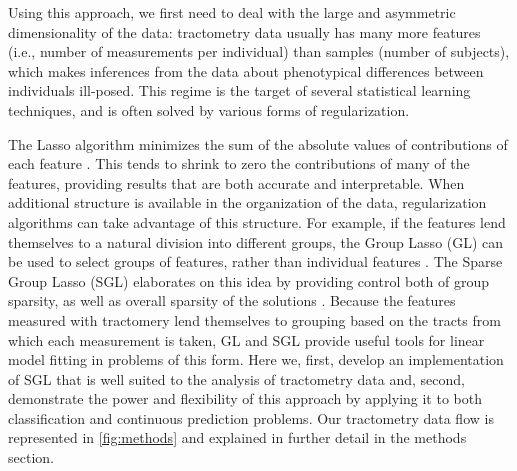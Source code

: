\documentclass[10pt,letterpaper]{article}
\begin{document}
Using this approach, we first need to deal with the large and
asymmetric dimensionality of the data: tractometry data usually has
many more features (i.e., number of measurements per individual) than
samples (number of subjects), which makes inferences from the data
about phenotypical differences between individuals ill-posed. This
regime is the target of several statistical learning techniques, and
is often solved by various forms of regularization.

The Lasso algorithm minimizes the sum of the absolute values of
contributions of each feature \cite{Tibshirani1996-qs}. This
tends to shrink to zero the contributions of many of the features,
providing results that are both accurate and interpretable. When
additional structure is available in the organization of the data,
regularization algorithms can take advantage of this structure. For
example, if the features lend themselves to a natural division into
different groups, the Group Lasso (GL) can be used to select groups
of features, rather than individual features \cite{Yuan2006-ky}.
The Sparse Group Lasso (SGL) elaborates on this idea by providing
control both of group sparsity, as well as overall sparsity of the
solutions \cite{simon2013sgl}. Because the features measured with
tractomery lend themselves to grouping based on the tracts from which
each measurement is taken, GL and SGL provide useful tools
for linear model fitting in problems of this form. Here we, first,
develop an implementation of SGL that is well suited to the analysis of
tractometry data and, second, demonstrate the power and flexibility of
this approach by applying it to both classification
and continuous prediction problems. Our tractometry data flow is
represented in \cref{fig:methods} and explained in further detail in
the methods section.
\end{document}
